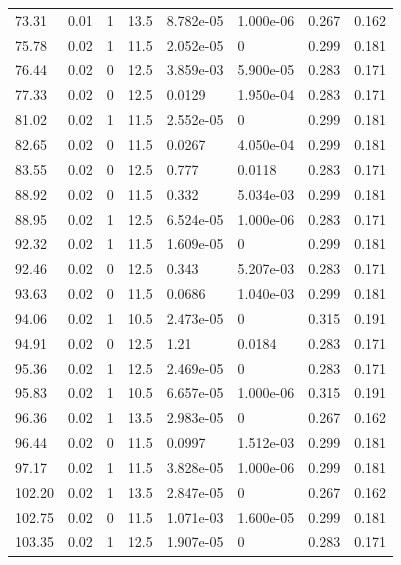 \documentclass[preview]{standalone}
\begin{document}
{{{\begin{tabular}{L{1.2cm}C{1.2cm} C{0.3cm}C{0.5cm} C{1.4cm}C{1.4cm} C{1.4cm}C{1.4cm}}
  73.31  &  0.01  & 1     & 13.5 &  8.782e-05  & 1.000e-06  & 0.267 &  0.162   \\ 
  75.78  &  0.02  & 1     & 11.5 &  2.052e-05  & 0  & 0.299 &  0.181   \\ 
  76.44  &  0.02  & 0     & 12.5 &  3.859e-03  & 5.900e-05  & 0.283 &  0.171   \\ 
  77.33  &  0.02  & 0     & 12.5 &  0.0129  & 1.950e-04  & 0.283 &  0.171   \\ 
  81.02  &  0.02  & 1     & 11.5 &  2.552e-05  & 0  & 0.299 &  0.181   \\ 
  82.65  &  0.02  & 0     & 11.5 &  0.0267  & 4.050e-04  & 0.299 &  0.181   \\ 
  83.55  &  0.02  & 0     & 12.5 &  0.777  & 0.0118  & 0.283 &  0.171   \\ 
  88.92  &  0.02  & 0     & 11.5 &  0.332  & 5.034e-03  & 0.299 &  0.181   \\ 
  88.95  &  0.02  & 1     & 12.5 &  6.524e-05  & 1.000e-06  & 0.283 &  0.171   \\ 
  92.32  &  0.02  & 1     & 11.5 &  1.609e-05  & 0  & 0.299 &  0.181   \\ 
  92.46  &  0.02  & 0     & 12.5 &  0.343  & 5.207e-03  & 0.283 &  0.171   \\ 
  93.63  &  0.02  & 0     & 11.5 &  0.0686  & 1.040e-03  & 0.299 &  0.181   \\ 
  94.06  &  0.02  & 1     & 10.5 &  2.473e-05  & 0  & 0.315 &  0.191   \\ 
  94.91  &  0.02  & 0     & 12.5 &  1.21  & 0.0184  & 0.283 &  0.171   \\ 
  95.36  &  0.02  & 1     & 12.5 &  2.469e-05  & 0  & 0.283 &  0.171   \\ 
  95.83  &  0.02  & 1     & 10.5 &  6.657e-05  & 1.000e-06  & 0.315 &  0.191   \\ 
  96.36  &  0.02  & 1     & 13.5 &  2.983e-05  & 0  & 0.267 &  0.162   \\ 
  96.44  &  0.02  & 0     & 11.5 &  0.0997  & 1.512e-03  & 0.299 &  0.181   \\ 
  97.17  &  0.02  & 1     & 11.5 &  3.828e-05  & 1.000e-06  & 0.299 &  0.181   \\ 
  102.20  &  0.02  & 1     & 13.5 &  2.847e-05  & 0  & 0.267 &  0.162   \\ 
  102.75  &  0.02  & 0     & 11.5 &  1.071e-03  & 1.600e-05  & 0.299 &  0.181   \\ 
  103.35  &  0.02  & 1     & 12.5 &  1.907e-05  & 0  & 0.283 &  0.171   \\ 

\end{tabular}}}}
\end{document}
